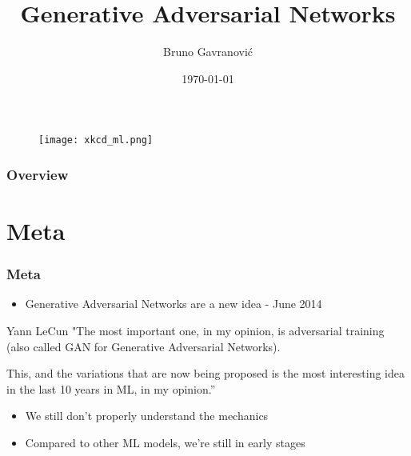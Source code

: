 \documentclass{Bredelebeamer}
\title[GAN]{Generative Adversarial Networks} %
\author{Bruno Gavranović} %
\institute[PSIML2018] %
{
Faculty of Electrical Engineering and Computing \\

University of Zagreb, Croatia \\

\medskip
\textit{bruno.gavranovic@fer.hr} %
}
\date{\today} %
\begin{document}
\begin{frame}
	\begin{figure}[h!]
		\centering
		\texttt{[image: xkcd\_ml.png]}
	\end{figure}
\end{frame}

\begin{frame}
\titlepage %
\end{frame}

\begin{frame}
\frametitle{Overview} %
\tableofcontents %
\end{frame}


\section{Meta} %

\begin{frame} \frametitle{Meta}
\begin{itemize}
	\item Generative Adversarial Networks are a new idea - June 2014
\end{itemize}

\pause
\begin{block}{Yann LeCun}
"The most important one, in my opinion, is adversarial training (also called GAN for Generative Adversarial Networks).

This, and the variations that are now being proposed is the most interesting idea in the last 10 years in ML, in my opinion.”
\end{block}

\begin{itemize}[<+(1)->]
	\item We still don't properly understand the mechanics
	\item Compared to other ML models, we're still in early stages
\end{itemize}
\end{frame}
\end{document}
